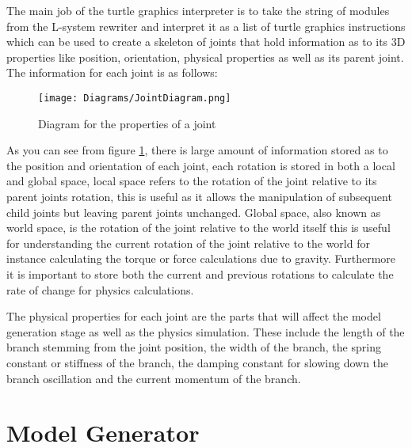 \begin{flushleft}

The main job of the turtle graphics interpreter is to take the string of modules from the L-system rewriter and interpret it as a list of turtle graphics instructions which can be used to create a skeleton of joints that hold information as to its 3D properties like position, orientation, physical properties as well as its parent joint. The information for each joint is as follows:

\begin{figure}[htbp]
	{\centering
		\vspace{7px}
		\texttt{[image: Diagrams/JointDiagram.png]}
		\caption{Diagram for the properties of a joint} \label{joint properties}
	}
\end{figure}

As you can see from figure \ref{joint properties}, there is large amount of information stored as to the position and orientation of each joint, each rotation is stored in both a local and global space, local space refers to the rotation of the joint relative to its parent joints rotation, this is useful as it allows the manipulation of subsequent child joints but leaving parent joints unchanged. Global space, also known as world space, is the rotation of the joint relative to the world itself this is useful for understanding the current rotation of the joint relative to the world for instance calculating the torque or force calculations due to gravity. Furthermore it is important to store both the current and previous rotations to calculate the rate of change for physics calculations.\\

\vspace{5mm}

The physical properties for each joint are the parts that will affect the model generation stage as well as the physics simulation. These include the length of the branch stemming from the joint position, the width of the branch, the spring constant or stiffness of the branch, the damping constant for slowing down the branch oscillation and the current momentum of the branch. 


\end{flushleft}


\section{Model Generator}

